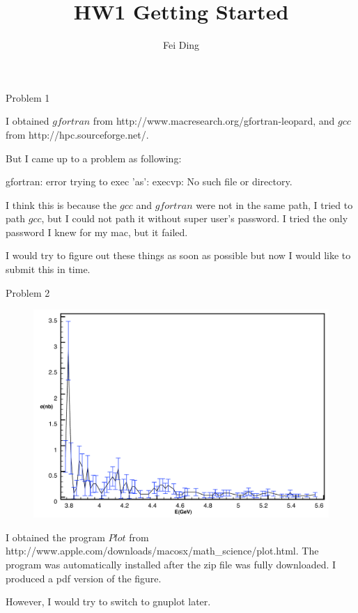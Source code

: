 \documentclass{article}
\title{HW1 Getting Started}
\author{Fei Ding}
\begin{document}
\maketitle

Problem 1

I obtained $gfortran$ from http://www.macresearch.org/gfortran-leopard, and $gcc$ from http://hpc.sourceforge.net/. 

But I came up to a problem as following: 

gfortran: error trying to exec 'as': execvp: No such file or directory. 

I think this is because the $gcc$ and $gfortran$ were not in the same path, I tried to path $gcc$, but I could not path it without super user's password.  I tried the only password I knew for my mac, but it failed.


I would try to figure out these things as soon as possible but now I would like to submit this in time.
 
\vskip 1cm




Problem 2
\begin{figure} [ht]
\includegraphics[width=1.0\textwidth]{hw1}
\end{figure}

I obtained the program $Plot$ from http://www.apple.com/downloads/macosx/math\_science/plot.html.  The program was automatically installed after the zip file was fully downloaded.  I produced a pdf version of the figure.

However, I would try to switch to gnuplot later.

\vskip 1cm
\end{document}
